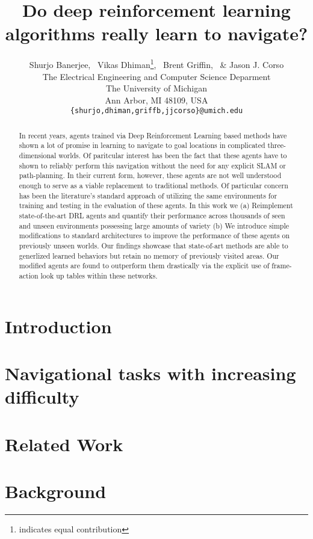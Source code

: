 \documentclass{article} %
\title{Do deep reinforcement learning algorithms really learn to navigate?}
\author{Shurjo Banerjee\footnotemark[1],%
  \, Vikas Dhiman\thanks{indicates equal contribution},%
  \, Brent Griffin,%
  \, \& Jason J. Corso\\
  The Electrical Engineering and Computer Science Deparment\\
The University of Michigan\\
Ann Arbor, MI 48109, USA \\
\texttt{\{shurjo,dhiman,griffb,jjcorso\}@umich.edu} \\
}
\begin{document}
\maketitle

\begin{abstract}
In recent years, agents trained via Deep Reinforcement Learning based methods have shown a lot of promise in learning to navigate to goal locations in complicated three-dimensional worlds. Of paritcular interest has been the fact that these agents have to shown to reliably perform this navigation  without the need for any explicit SLAM or path-planning. In their current form, however, these agents are not well understood enough to serve as a viable replacement to traditional methods. Of particular concern has been the literature's standard approach of utilizing the same environments for training and testing in the evaluation of these agents. In this work we (a) Reimplement state-of-the-art DRL agents and quantify their performance across thousands of seen and unseen environments possessing large amounts of variety (b) We introduce simple modifications to standard architectures to improve the performance of these agents on previously unseen worlds. Our findings showcase that state-of-art methods are able to generlized learned behaviors but retain no memory of previously visited areas. Our modified agents are found to outperform them drastically via the explicit use of frame-action look up tables within these networks. 
\end{abstract}

\section{Introduction}
%

\section{Navigational tasks with increasing difficulty}
\label{sec:navtasks}


\section{Related Work}


\section{Background}

\end{document}
